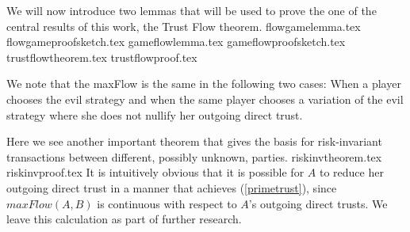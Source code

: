   We will now introduce two lemmas that will be used to prove the one of the central results of this work, the Trust Flow
  theorem.
  {flowgamelemma.tex}
  {flowgameproofsketch.tex}
  {gameflowlemma.tex}
  {gameflowproofsketch.tex}
  {trustflowtheorem.tex}
  {trustflowproof.tex}

   We note that the maxFlow is the same in the following two cases: When a player chooses the evil strategy and when the same
   player chooses a variation of the evil strategy where she does not nullify her outgoing direct trust.

   Here we see another important theorem that gives the basis for risk-invariant transactions between different, possibly
   unknown, parties.
   {riskinvtheorem.tex}
   {riskinvproof.tex}
   It is intuitively obvious that it is possible for $A$ to reduce her outgoing direct trust in a manner that achieves
   (\ref{primetrust}), since $maxFlow\left(A, B\right)$ is continuous with respect to $A$'s outgoing direct trusts. We
   leave this calculation as part of further research.
